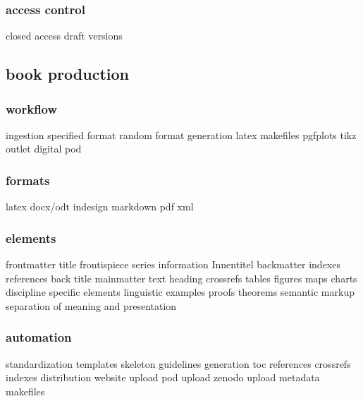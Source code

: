 \documentclass[output=guidelines,guidelines] {langscibook}
\begin{document}
\subsubsection{access control}
                    closed access
                    draft versions
\subsection{book production}
\subsubsection{workflow}
                    ingestion 
                        specified format
                        random format
                    generation
                        latex
                        makefiles
                        pgfplots
                        tikz
                    outlet
                        digital
                        pod
\subsubsection{formats}
                    latex
                    docx/odt
                    indesign
                    markdown
                    pdf
                    xml
\subsubsection{elements}
                    frontmatter
                        title
                        frontispiece
                        series information
                        Innentitel
                    backmatter
                        indexes
                        references
                        back title
                    mainmatter
                        text
                        heading
                        crossrefs
                        tables
                        figures
                        maps
                        charts
                        discipline specific elements
                            linguistic examples
                            proofs
                            theorems
                    semantic markup
                        separation of meaning and presentation
\subsubsection{automation}
                    standardization
                        templates
                        skeleton
                        guidelines
                    generation
                        toc
                        references
                        crossrefs
                        indexes
                    distribution
                        website upload
                        pod upload
                        zenodo upload
                    metadata
                    makefiles
\end{document}
